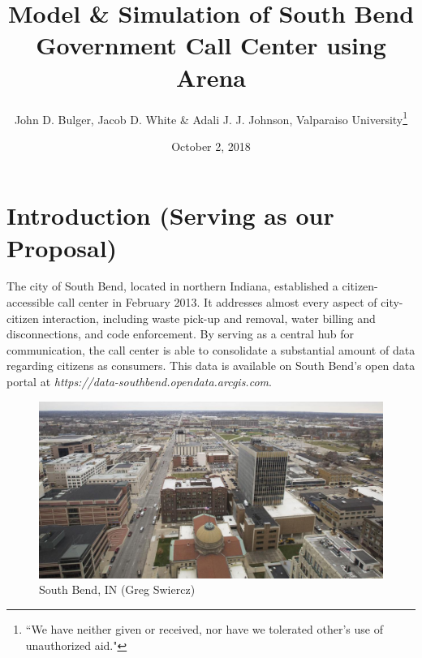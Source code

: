 \documentclass[11pt,twocolumn]{article}
\title{Model \& Simulation of South Bend Government Call Center using Arena}
\author{John D. Bulger, Jacob D. White \& Adali J. J. Johnson, Valparaiso University\thanks{``We have neither given or received, nor have we tolerated other’s use of unauthorized aid."}}
\date{October 2, 2018}
\begin{document}
\maketitle

\section{Introduction (Serving as our Proposal)}
The city of South Bend, located in northern Indiana, established a citizen-accessible call center in February 2013.  It addresses almost every aspect of city-citizen interaction, including waste pick-up and removal, water billing and disconnections, and code enforcement.  By serving as a central hub for communication, the call center is able to consolidate a substantial amount of data regarding citizens as consumers.  This data is available on South Bend's open data portal at \textit{https://data-southbend.opendata.arcgis.com}.

\begin{figure}[h]
	\includegraphics[scale=.17]{south_bend.png}
	\caption{South Bend, IN (Greg Swiercz)}
\end{figure}
\end{document}
